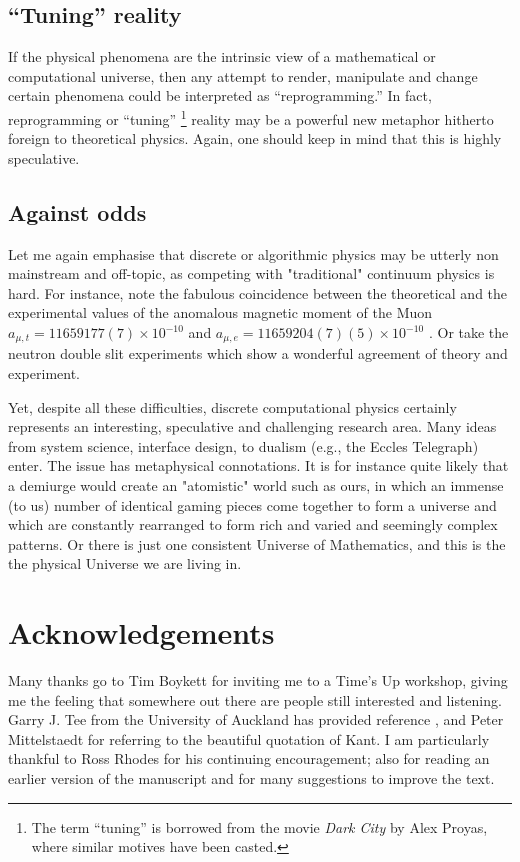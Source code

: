 \documentclass[pre,preprint,showpacs,showkeys,amsfonts]{revtex4}
\begin{document}
\subsection{``Tuning'' reality}

If the physical phenomena are the intrinsic view of a mathematical
or computational universe, then any attempt to render, manipulate and
change certain phenomena could be interpreted as ``reprogramming.''
In fact, reprogramming or ``tuning''
\footnote{
The term ``tuning'' is borrowed from the movie
{\it Dark City} by Alex Proyas, where similar motives have been casted.}
reality may be a powerful new metaphor hitherto foreign to theoretical physics.
Again, one should keep in mind that this is highly speculative.

\subsection{Against odds}
Let me again emphasise that
discrete or algorithmic physics may be  utterly non mainstream and off-topic,
as
competing with "traditional" continuum physics is hard.
For instance, note the fabulous coincidence between the theoretical
and the experimental values of the anomalous magnetic moment of the Muon
$a_{\mu ,t} = 11 659 177(7)\times 10^{-10}$ and
$a_{\mu ,e} = 11 659 204(7)(5) \times 10^{-10}$
\cite{muong-2Collaboration}.
Or take the neutron double slit experiments \cite{zeilinger:ds}
which show a wonderful agreement of theory and experiment.

Yet, despite all these difficulties,
discrete computational physics certainly represents an interesting,
speculative and challenging research area.
Many ideas from system science, interface design,
to  dualism  (e.g., the  Eccles Telegraph) enter.
The issue has metaphysical connotations.
It is for instance quite likely that a demiurge would create
an "atomistic" world such as ours, in which
an immense (to us) number of identical gaming pieces come together to form a universe and
which are constantly rearranged to
form rich and varied and seemingly complex patterns.
Or there is just one consistent Universe of Mathematics,
and this is the the physical Universe we are living in.


\section*{Acknowledgements}
Many thanks go to Tim Boykett for inviting me to a Time's Up workshop,
giving me the
feeling that somewhere out there are people still interested and listening.
Garry J. Tee from the University of Auckland has provided reference \cite{Thomas},
and Peter Mittelstaedt for referring to the beautiful quotation of Kant.
I am particularly thankful to Ross Rhodes
for his continuing encouragement; also for
reading an earlier version of the manuscript and for  many
suggestions to improve the text.




%

%
\end{document}
